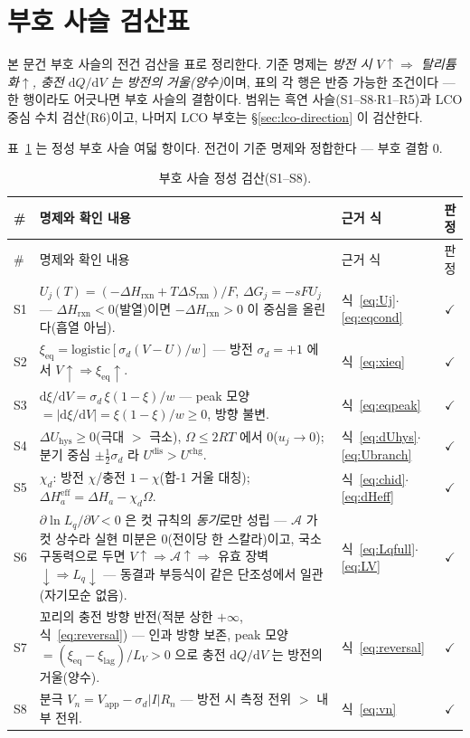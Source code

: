 \documentclass[11pt,a4paper]{article}
\newcommand{\dd}{\mathrm{d}}
\newcommand{\eff}{\mathrm{eff}}
\newcommand{\eq}{\mathrm{eq}}
\newcommand{\app}{\mathrm{app}}
\newcommand{\rxn}{\mathrm{rxn}}
\newcommand{\dis}{\mathrm{dis}}
\newcommand{\chg}{\mathrm{chg}}
\newcommand{\hys}{\mathrm{hys}}
\begin{document}
\appendix
\section{부호 사슬 검산표}\label{sec:signcheck}
본 문건 부호 사슬의 전건 검산을 표로 정리한다. 기준 명제는 \emph{방전 시 $V\!\uparrow\Rightarrow$
탈리튬화$\uparrow$, 충전 $\dd Q/\dd V$ 는 방전의 거울(양수)}이며, 표의 각 행은 반증 가능한 조건이다 ---
한 행이라도 어긋나면 부호 사슬의 결함이다. 범위는 흑연 사슬(S1--S8$\cdot$R1--R5)과 LCO 중심 수치
검산(R6)이고, 나머지 LCO 부호는 \S\ref{sec:lco-direction} 이 검산한다.

표~\ref{tab:signcheck-S} 는 정성 부호 사슬 여덟 항이다. 전건이 기준 명제와 정합한다 --- 부호 결함 $0$.

\begin{longtable}{@{}l p{8.6cm} p{3.3cm} c@{}}
\caption{부호 사슬 정성 검산(S1--S8).}\label{tab:signcheck-S}\\
\toprule
\# & 명제와 확인 내용 & 근거 식 & 판정 \\
\midrule
\endfirsthead
\toprule
\# & 명제와 확인 내용 & 근거 식 & 판정 \\
\midrule
\endhead
S1 & $U_j(T)=(-\Delta H_\rxn+T\Delta S_\rxn)/F$, $\Delta G_j=-sFU_j$ --- $\Delta H_\rxn<0$(발열)이면
$-\Delta H_\rxn>0$ 이 중심을 올린다(흡열 아님). & 식~\eqref{eq:Uj}$\cdot$\eqref{eq:eqcond} & $\checkmark$ \\
S2 & $\xi_\eq=\mathrm{logistic}[\sigma_d(V-U)/w]$ --- 방전 $\sigma_d=+1$ 에서
$V\!\uparrow\Rightarrow\xi_\eq\!\uparrow$. & 식~\eqref{eq:xieq} & $\checkmark$ \\
S3 & $\dd\xi/\dd V=\sigma_d\,\xi(1-\xi)/w$ --- peak 모양 $=|\dd\xi/\dd V|=\xi(1-\xi)/w\ge0$, 방향 불변.
& 식~\eqref{eq:eqpeak} & $\checkmark$ \\
S4 & $\Delta U_\hys\ge0$(극대 $>$ 극소), $\Omega\le2RT$ 에서 $0$($u_j\to0$); 분기 중심 $\pm\tfrac12\sigma_d$
라 $U^{\dis}>U^{\chg}$. & 식~\eqref{eq:dUhys}$\cdot$\eqref{eq:Ubranch} & $\checkmark$ \\
S5 & $\chi_d$: 방전 $\chi$/충전 $1-\chi$(합-1 거울 대칭); $\Delta H_a^\eff=\Delta H_a-\chi_d\Omega$.
& 식~\eqref{eq:chid}$\cdot$\eqref{eq:dHeff} & $\checkmark$ \\
S6 & $\partial\ln L_q/\partial V<0$ 은 컷 규칙의 \emph{동기}로만 성립 --- $\mathcal A$ 가 컷 상수라 실현
미분은 $0$(전이당 한 스칼라)이고, 국소 구동력으로 두면 $V\!\uparrow\Rightarrow\mathcal
A\!\uparrow\Rightarrow$ 유효 장벽 $\downarrow\Rightarrow L_q\downarrow$ --- 동결과 부등식이 같은
단조성에서 일관(자기모순 없음). & 식~\eqref{eq:Lqfull}$\cdot$\eqref{eq:LV} & $\checkmark$ \\
S7 & 꼬리의 충전 방향 반전(적분 상한 $+\infty$, 식~\eqref{eq:reversal}) --- 인과 방향 보존,
peak 모양 $=(\xi_\eq-\xi_\mathrm{lag})/L_V>0$ 으로 충전 $\dd Q/\dd V$ 는 방전의 거울(양수).
& 식~\eqref{eq:reversal} & $\checkmark$ \\
S8 & 분극 $V_n=V_\app-\sigma_d|I|R_n$ --- 방전 시 측정 전위 $>$ 내부 전위. & 식~\eqref{eq:vn} & $\checkmark$ \\
\bottomrule
\end{longtable}
\end{document}
